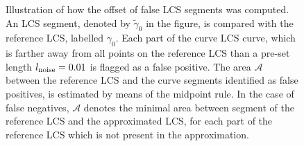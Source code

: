 \begin{figure}[htpb]
    \centering
    \def\svgwidth{0.8\linewidth}
    
    \caption[Illustration of how the offset of false LCS segments was computed]%
    {Illustration of how the offset of false LCS segments was computed.
    An LCS segment, denoted by $\widetilde{\gamma}_{0}$ in the figure, is
    compared with the reference LCS, labelled $\gamma_{0}$. Each part of the
    curve LCS curve, which is farther away from all points on the reference LCS
    than a pre-set length $l_{\textnormal{noise}}=0.01$ is flagged as a
    false positive. The area $\mathcal{A}$ between the reference LCS and the
    curve segments identified as false positives, is estimated by means of the
    midpoint rule. In the case of false negatives, $\mathcal{A}$ denotes the
    minimal area between segment of the reference LCS and the approximated LCS,
    for each part of the reference LCS which is not present in the
approximation.}
    \label{fig:fp_fn_principle}
\end{figure}



